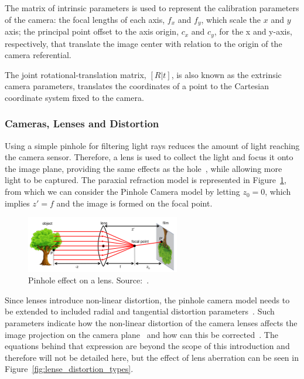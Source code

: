 The matrix of intrinsic parameters is used to represent the calibration parameters of the camera: the focal lengths of each axis, $f_x$ and $f_y$, which scale the $x$ and $y$ axis; the principal point offset to the axis origin, $c_x$ and $c_y$, for the x and y-axis, respectively, that translate the image center with relation to the origin of the camera referential. 

The joint rotational-translation matrix, $[R|t]$, is also known as the extrinsic camera parameters, translates the coordinates of a point to the Cartesian coordinate system fixed to the camera.


\subsubsection{Cameras, Lenses and Distortion}
Using a simple pinhole for filtering light rays 
reduces the amount of light reaching the camera sensor. Therefore, a lens is used to collect the light and focus it onto the image plane, providing the same effects as the hole~\cite{Sturm2010}, while allowing more light to be captured. The paraxial refraction model is represented in Figure~\ref{fig:pinhole_with_lense}, from which we can consider the Pinhole Camera model by letting $z_0 = 0$, which implies $z' = f$ and the image is formed on the focal point.


\begin{figure}[!ht]
	\centering
	\includegraphics[width=0.6\textwidth]{img/camera/pinhole_with_lense.png}
	\caption[Pinhole effect on a lens.]{Pinhole effect on a lens. Source:~\cite{camera_models}.}
	\label{fig:pinhole_with_lense}
\end{figure}

Since lenses introduce non-linear distortion, the pinhole camera model needs to be extended to included radial and tangential distortion parameters~\cite{Bouguet2010, manuapphotogrammetry, Heikkila1997}. Such parameters indicate how the non-linear distortion of the camera lenses affects the image projection on the camera plane~\cite{camera_models, Sturm2010} and how can this be corrected~\cite{Heikkila1997, Bouguet2010, opencv_doc}. The equations behind that expression are beyond the scope of this introduction and therefore will not be detailed here, but the effect of lens aberration can be seen in Figure~\ref{fig:lense_distortion_types}.


